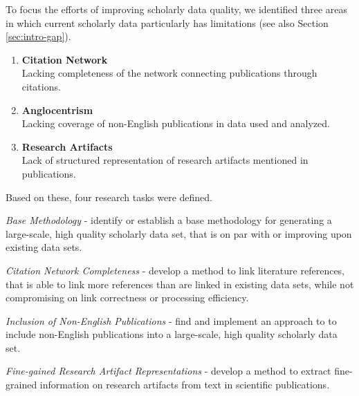 To focus the efforts of improving scholarly data quality, we identified three areas in which current scholarly data particularly has limitations (see also Section \ref{sec:intro-gap}).

\begin{enumerate}
    \item \textbf{Citation Network}\\
          Lacking completeness of the network connecting publications through citations.
    \item \textbf{Anglocentrism}\\
          Lacking coverage of non-English publications in data used and analyzed.
    \item \textbf{Research Artifacts}\\
           Lack of structured representation of research artifacts mentioned in publications.
\end{enumerate}

Based on these, four research tasks were defined.

\begin{rtlist}
    \item \textit{Base Methodology} - identify or establish a base methodology for generating a large-scale, high quality scholarly data set, that is on par with or improving upon existing data sets.
    \item \textit{Citation Network Completeness} - develop a method to link literature references, that is able to link more references than are linked in existing data sets, while not compromising on link correctness or processing efficiency.
    \item \textit{Inclusion of Non-English Publications} - find and implement an approach to to include non-English publications into a large-scale, high quality scholarly data set.
    \item \textit{Fine-gained Research Artifact Representations} - develop a method to extract fine-grained information on research artifacts from text in scientific publications.
\end{rtlist}

